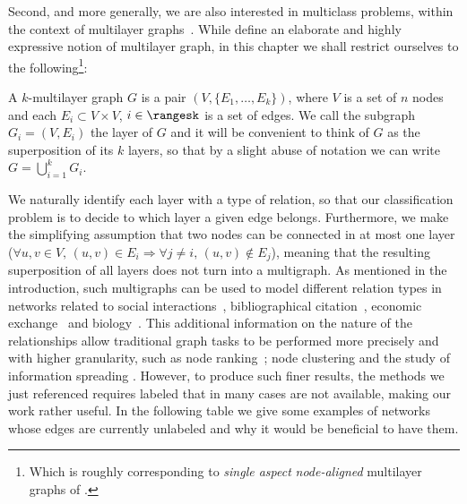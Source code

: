 Second, and more generally, we are also interested in multiclass problems, within the context of
multilayer graphs~\autocites{Kivela2014}{multiSurvey14}. While \textcite{Kivela2014} define an
elaborate and highly expressive notion of multilayer graph, in this chapter we shall restrict
ourselves to the following\footnote{Which is roughly corresponding to \emph{single aspect}
\emph{node-aligned} multilayer graphs of \autocite{Kivela2014}.}:
\begin{definition}
  A $k$-multilayer graph $G$ is a pair $(V, \{E_1, \ldots, E_k \})$, where $V$ is a set of $n$ nodes
  and each $E_i \subset V\times V$, $i \in \rangesk$ is a set of edges. We call the subgraph $G_i =
  (V, E_i)$ the \ith{} layer of $G$ and it will be convenient to think of $G$ as the superposition
  of its $k$ layers, so that by a slight abuse of notation we can write $ G = \bigcup_{i=1}^k G_i $.
\end{definition}%
We naturally identify each layer with a type of relation, so that our classification problem is to
decide to which layer a given edge belongs. Furthermore, we make the simplifying assumption that two
nodes can be connected in at most one layer (\ie $\forall u,v \in V,\, (u,v)\in E_i \Rightarrow
\forall j \neq i,\, (u,v) \notin E_j$), meaning that the resulting superposition of all layers does
not turn into a multigraph. As mentioned in the introduction, such multigraphs can be used to model
different relation types in networks related to social
interactions~\autocites{Szell2010}{RecoFlickrMulti11}, bibliographical
citation~\autocites{communityDBLPbyConf05}{articlesMultiSim11}, economic
exchange~\autocites{ports3kindofships10}{worldTradeNetwork10} and biology~\autocite{bioLayerExp11}.
This additional information on the nature of the relationships allow traditional graph tasks to be
performed more precisely and with higher granularity, such as node ranking~\autocite{HRRanking13};
node clustering \autocites[Section 2]{surveyAttributedClustering15}[Section 4.5.1]{Kivela2014} and
the study of information spreading \autocite{SpreadingMultiSurvey15}. However, to produce such finer
results, the methods we just referenced requires labeled that in many cases are not available,
making our work rather useful. In the following table we give some examples of networks whose edges
are currently unlabeled and why it would be beneficial to have them.

